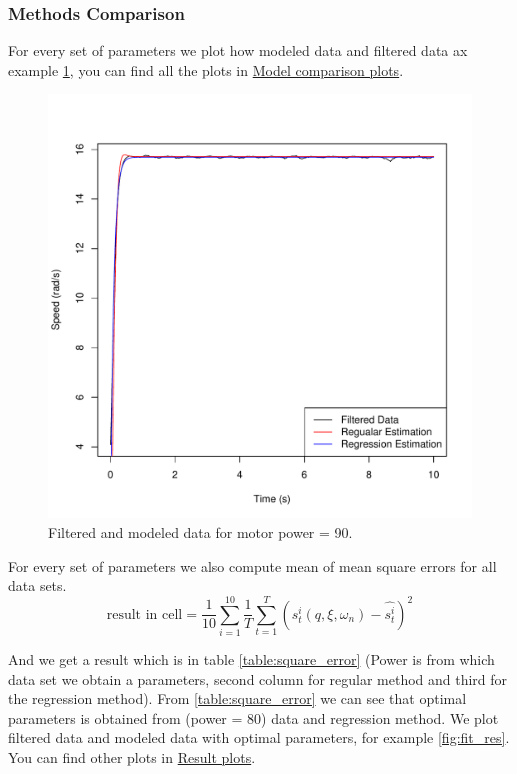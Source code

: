 \documentclass[a4paper,12pt,oneside]{article}
\begin{document}
\subsubsection {Methods Comparison}
For every set of parameters we plot how modeled data and filtered data ax example \cref{fig:fit_dual}, you can find all the plots in \href{https://github.com/AliaksandrSiarohin/AppliedRobotics/tree/master/motor_data/plots/dual_estimation}{Model comparison plots}.
\begin{figure}[t]%
	\centering
	\includegraphics[width=\columnwidth]{../motor_data/plots/dual_estimation/90}
	\caption{Filtered and modeled data for motor power = 90.}%
	\label{fig:fit_dual}%
\end{figure}
For every set of parameters we also compute mean of mean square errors for all data sets.
\begin{equation}
\text{result in cell} = \frac{1}{10}\sum_{i=1}^{10}\frac{1}{T}\sum_{t=1}^{T}{(s_t^i(q, \xi, \omega_{n}) - \hat{s_t^i}) ^ 2}
\end{equation}

And we get a result which is in table \cref{table:square_error} (Power is from which data set we obtain a parameters, second column for regular method and third for the regression method). From \cref{table:square_error} we can see that optimal parameters is obtained from (power = 80) data and regression method. We plot filtered data and modeled data with optimal parameters, for example \cref{fig:fit_res}. You can find other plots in \href{https://github.com/AliaksandrSiarohin/AppliedRobotics/tree/master/motor_data/plots/result_estimation}{Result plots}.
\end{document}
